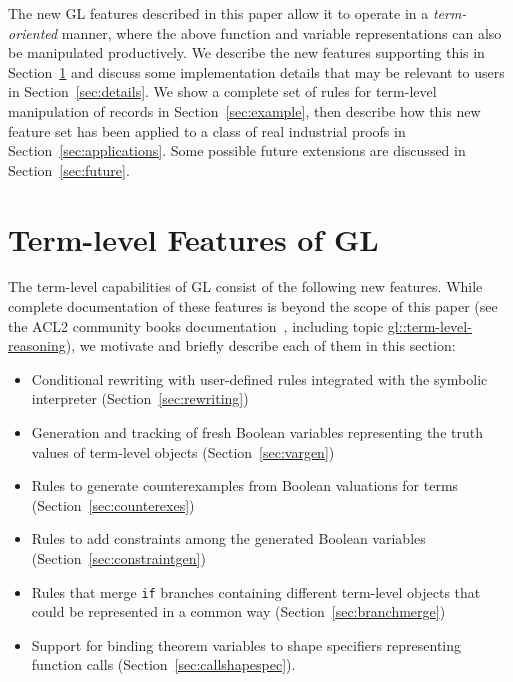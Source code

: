 \documentclass[submission,copyright,creativecommons]{eptcs}
\begin{document}
The new GL features described in this paper allow it to operate in a
{\em term-oriented} manner, where the above function and variable
representations can also be manipulated productively.  We describe the
new features supporting this in Section~\ref{sec:features} and discuss
some implementation details that may be relevant to users in
Section~\ref{sec:details}.  We show a complete set of rules for
term-level manipulation of records in Section~\ref{sec:example}, then
describe how this new feature set has been applied to a class of real
industrial proofs in Section~\ref{sec:applications}. Some possible
future extensions are discussed in Section~\ref{sec:future}.

\section{Term-level Features of GL}
\label{sec:features}
The term-level capabilities of GL consist of the following new
features. 
While complete documentation of these features is beyond
the scope of this paper (see the ACL2 community books
documentation~\cite{acl2:doc}, including topic
\href{http://www.cs.utexas.edu/users/moore/acl2/manuals/current/manual/?topic=GL____TERM-LEVEL-REASONING}{\underline{gl::term-level-reasoning}}), we motivate and briefly describe each of them in this section:

\begin{itemize}
\item Conditional rewriting with user-defined rules integrated with the symbolic interpreter (Section~\ref{sec:rewriting})
\item Generation and tracking of fresh Boolean variables representing the truth values of term-level objects (Section~\ref{sec:vargen})
\item Rules to generate counterexamples from Boolean valuations for terms (Section~\ref{sec:counterexes})
\item Rules to add constraints among the generated Boolean variables (Section~\ref{sec:constraintgen})
\item Rules that merge \texttt{if} branches containing different term-level objects that could be represented in a common way (Section~\ref{sec:branchmerge})
\item Support for binding theorem variables to shape specifiers representing function calls (Section~\ref{sec:callshapespec}).
\end{itemize}
\end{document}
